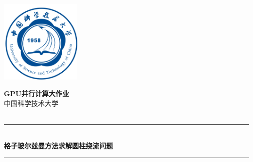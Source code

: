 \begin{titlepage}

\newcommand{\HRule}{\rule{\linewidth}{0.5mm}} %


\includegraphics[width = 4cm]{./figures/ustcblue}\\[0.5cm] 

\begin{center} %

\textbf{\Huge GPU并行计算大作业}\\[1.5cm] 
\textup{\huge 中国科学技术大学}\\[0.5cm] 
\textup{\Large }\\[0.5cm] 
\HRule \\[0.4cm]
{ \Huge \bfseries 格子玻尔兹曼方法求解圆柱绕流问题}\\ %
\HRule \\[1.5cm]


\end{center}
\end{titlepage}
